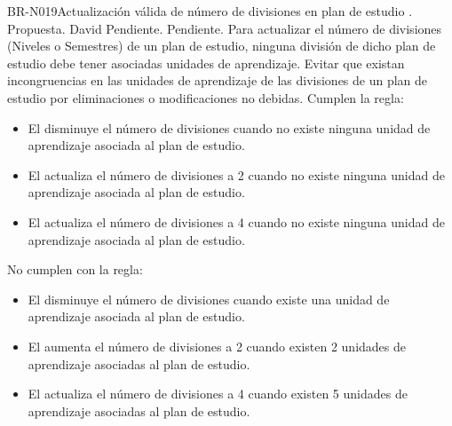 \begin{BusinessRule}{BR-N019}{Actualización válida de número de divisiones en plan de estudio}
	{\bcIntegridad}    %
	{\btEnabler}     %
	{\blControlling}    %
	.
	\BRItem[Estado] Propuesta.
	 David
	 Pendiente.
	 Pendiente.
	\BRItem[Descripción] Para actualizar el número de divisiones (Niveles o Semestres) de un plan de estudio, ninguna división de dicho plan de estudio debe tener asociadas unidades de aprendizaje. 
	\BRItem[Motivación] Evitar que existan incongruencias en las unidades de aprendizaje de las divisiones de un plan de estudio por eliminaciones o modificaciones no debidas.
	 Cumplen la regla:
	\begin{itemize}
		\item El  disminuye el número de divisiones cuando no existe ninguna unidad de aprendizaje asociada al plan de estudio.
		\item El  actualiza el número de divisiones a 2 cuando no existe ninguna unidad de aprendizaje asociada al plan de estudio.
		\item El  actualiza el número de divisiones a 4 cuando no existe ninguna unidad de aprendizaje asociada al plan de estudio.
	\end{itemize}
	 No cumplen con la regla:
	\begin{itemize}
		\item El  disminuye el número de divisiones cuando existe una unidad de aprendizaje asociada al plan de estudio.
		\item El  aumenta el número de divisiones a 2 cuando existen 2 unidades de aprendizaje asociadas al plan de estudio.
		\item El  actualiza el número de divisiones a 4 cuando existen 5 unidades de aprendizaje asociadas al plan de estudio.
\end{itemize}
	
\end{BusinessRule}

